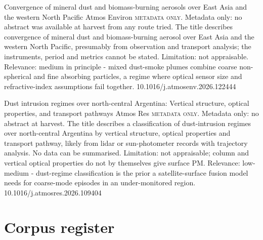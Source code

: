 \documentclass[10pt]{article}
\begin{document}
{Convergence of mineral dust and biomass-burning aerosols over East Asia and the western North Pacific}
{Atmos Environ}
{\textsc{metadata only.} Metadata only: no abstract was available at harvest from any route tried. The title describes convergence of mineral dust and biomass-burning aerosol over East Asia and the western North Pacific, presumably from observation and transport analysis; the instruments, period and metrics cannot be stated. Limitation: not appraisable. Relevance: medium in principle - mixed dust-smoke plumes combine coarse non-spherical and fine absorbing particles, a regime where optical sensor size and refractive-index assumptions fail together.}
{10.1016/j.atmosenv.2026.122444}

{Dust intrusion regimes over north-central Argentina: Vertical structure, optical properties, and transport pathways}
{Atmos Res}
{\textsc{metadata only.} Metadata only: no abstract at harvest. The title describes a classification of dust-intrusion regimes over north-central Argentina by vertical structure, optical properties and transport pathway, likely from lidar or sun-photometer records with trajectory analysis. No data can be summarised. Limitation: not appraisable; column and vertical optical properties do not by themselves give surface PM. Relevance: low-medium - dust-regime classification is the prior a satellite-surface fusion model needs for coarse-mode episodes in an under-monitored region.}
{10.1016/j.atmosres.2026.109404}

\clearpage
\section*{\sffamily\bfseries\color{Deep}Corpus register}
\vspace{-1.5mm}{\color{Amber}\rule{\linewidth}{1.1pt}}\vspace{2.5mm}



\vspace{2mm}
\end{document}
